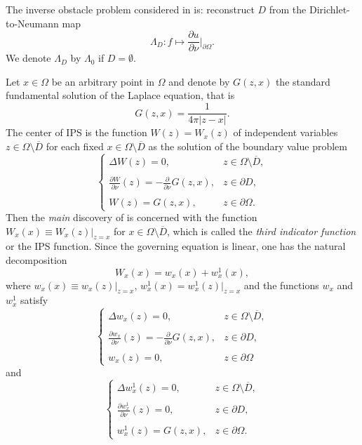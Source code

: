 The inverse obstacle problem considered in \cite{IPS} is:
reconstruct $D$ from the Dirichlet-to-Neumann map
$$\displaystyle
\Lambda_D:f\longmapsto\frac{\partial u}{\partial\nu}\vert_{\partial\Omega}.
$$
We denote $\Lambda_D$ by $\Lambda_0$ if $D=\emptyset$.






Let $x\in\Omega$ be an arbitrary point in $\Omega$ and 
denote by $G(z,x)$ the standard fundamental solution of the Laplace equation, that is
$$\displaystyle
G(z,x)=\frac{1}{4\pi\vert z-x\vert}.
$$
The center of IPS is the function $W(z)=W_x(z)$ of  independent variables $z\in\Omega\setminus\overline{D}$
for each fixed $x\in\Omega\setminus\overline{D}$ as the solution 
of the boundary value problem
$$
\left\{\begin{array}{ll}
\Delta W(z)=0, & z\in\Omega\setminus\overline{D},
\\
\\
\displaystyle
\frac{\partial W}{\partial\nu}(z)=-\frac{\partial}{\partial\nu}G(z,x), & z\in\partial D,
\\
\\
\displaystyle
W(z)=G(z,x),  & z\in\partial\Omega.
\end{array}
\right.
\tag {1.1}
$$
Then the {\it main} discovery of \cite{IPS} is concerned with the function $W_x(x)\equiv W_x(z)\vert_{z=x}$ for $x\in\Omega\setminus\overline{D}$, which is called the {\it third indicator function}
or the IPS function.
Since the governing equation is linear, one has the natural decomposition
$$\displaystyle
W_x(x)=w_x(x)+w_x^1(x),
\tag {1.2}
$$
where
$w_x(x)\equiv w_x(z)\vert_{z=x}$, $w_x^1(x)=w_x^1(z)\vert_{z=x}$ and 
the functions $w_x$ and $w_x^1$ satisfy
$$
\left\{\begin{array}{ll}
\Delta w_x(z)=0, & z\in\Omega\setminus\overline{D},
\\
\\
\displaystyle
\frac{\partial w_x}{\partial\nu}(z)=-\frac{\partial}{\partial\nu}G(z,x), & z\in\partial D,
\\
\\
\displaystyle
w_x(z)=0,  & z\in\partial\Omega
\end{array}
\right.
\tag {1.3}
$$
and
$$
\left\{\begin{array}{ll}
\Delta w_x^1(z)=0, & z\in\Omega\setminus\overline{D},
\\
\\
\displaystyle
\frac{\partial w_x^1}{\partial\nu}(z)=0, & z\in\partial D,
\\
\\
\displaystyle
w_x^1(z)=G(z,x),  & z\in\partial\Omega.
\end{array}
\right.
\tag {1.4}
$$
